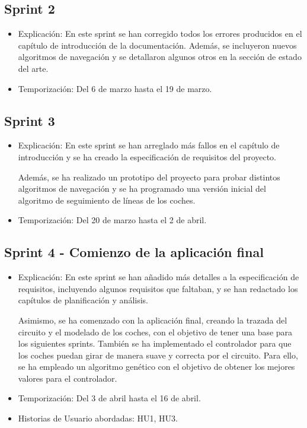 \subsection{Sprint 2}
\begin{itemize}
    \item Explicación: En este sprint se han corregido todos los errores producidos en el capítulo de introducción de la documentación. Además, se incluyeron nuevos algoritmos de navegación y se detallaron algunos otros en la sección de estado del arte.
    \item Temporización: Del 6 de marzo hasta el 19 de marzo. 
\end{itemize}

\subsection{Sprint 3}
\begin{itemize}
    \item Explicación: En este sprint se han arreglado más fallos en el capítulo de introducción y se ha creado la especificación de requisitos del proyecto.
    
    Además, se ha realizado un prototipo del proyecto para probar distintos algoritmos de navegación y se ha programado una versión inicial del algoritmo de seguimiento de líneas de los coches.
    \item Temporización: Del 20 de marzo hasta el 2 de abril.
\end{itemize}


\subsection{Sprint 4 - Comienzo de la aplicación final}
\begin{itemize}
    \item Explicación: En este sprint se han añadido más detalles a la especificación de requisitos, incluyendo algunos requisitos que faltaban, y se han redactado los capítulos de planificación y análisis.
    
    Asimismo, se ha comenzado con la aplicación final, creando la trazada del circuito y el modelado de los coches, con el objetivo de tener una base para los siguientes sprints. También se ha implementado el controlador para que los coches puedan girar de manera suave y correcta por el circuito. Para ello, se ha empleado un algoritmo genético con el objetivo de obtener los mejores valores para el controlador.

    \item Temporización: Del 3 de abril hasta el 16 de abril.
    \item Historias de Usuario abordadas: HU1, HU3.
\end{itemize}

